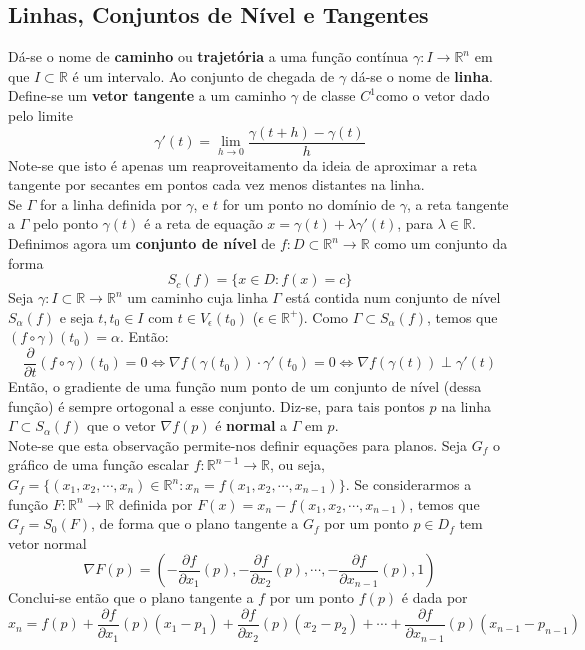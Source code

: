 \documentclass{article}
\newcommand{\R}{\mathbb{R}}
\begin{document}
\subsection{Linhas, Conjuntos de Nível e Tangentes}
Dá-se o nome de \textbf{caminho} ou \textbf{trajetória} a uma função contínua $\gamma: I \to \R^n$ em que $I \subset \R$ é um intervalo. Ao conjunto de chegada de $\gamma$ dá-se o nome de \textbf{linha}.\\
Define-se um \textbf{vetor tangente} a um caminho $\gamma$ de classe $C^1$como o vetor dado pelo limite
$$
\gamma '(t) = \lim_{h \to 0} \frac{\gamma(t+h)-\gamma(t)}{h}
$$
Note-se que isto é apenas um reaproveitamento da ideia de aproximar a reta tangente por secantes em pontos cada vez menos distantes na linha.\\
Se $\Gamma$ for a linha definida por $\gamma$, e $t$ for um ponto no domínio de $\gamma$, a reta tangente a $\Gamma$ pelo ponto $\gamma (t)$ é a reta de equação $x = \gamma(t) + \lambda \gamma '(t)$, para $\lambda \in \R$. \\
Definimos agora um \textbf{conjunto de nível} de $f: D \subset \R^n \to \R$ como um conjunto da forma 
$$
S_c(f) = \{ x \in D: f(x)=c \}
$$
Seja $\gamma: I \subset \R \to \R^n$ um caminho cuja linha $\Gamma$ está contida num conjunto de nível $S_\alpha (f)$ e seja $t, t_0 \in I$ com $t \in V_\epsilon(t_0)$ ($\epsilon \in \R^+$). Como $\Gamma \subset S_\alpha(f)$, temos que $(f \circ \gamma) (t_0) = \alpha$. Então:
$$
\frac{\partial}{\partial t} (f \circ \gamma)(t_0) = 0 \Leftrightarrow \nabla f(\gamma(t_0)) \cdot \gamma'(t_0) = 0 \Leftrightarrow \nabla f(\gamma (t)) \perp \gamma'(t)
$$
Então, o gradiente de uma função num ponto de um conjunto de nível (dessa função) é sempre ortogonal a esse conjunto. Diz-se, para tais pontos $p$ na linha $\Gamma \subset S_\alpha (f)$ que o vetor $\nabla f(p)$ é \textbf{normal} a $\Gamma$ em $p$.\\ 
Note-se que esta observação permite-nos definir equações para planos. Seja $G_f$ o gráfico de uma função escalar $f: \R^{n-1} \to \R$, ou seja, $G_f = \{ (x_1, x_2, \cdots, x_n) \in \R^n : x_n = f(x_1, x_2, \cdots , x_{n-1}) \}$. Se considerarmos a função $F: \R^n \to \R$ definida por $F(x) = x_n - f(x_1, x_2, \cdots , x_{n-1})$, temos que $G_f = S_0(F)$, de forma que o plano tangente a $G_f$ por um ponto $p \in D_f$ tem vetor normal 
$$
\nabla F(p) = \left( -\frac{\partial f}{\partial x_1}(p), -\frac{\partial f}{\partial x_2}(p), \cdots , -\frac{\partial f}{\partial x_{n-1}}(p), 1 \right)  
$$
Conclui-se então que o plano tangente a $f$ por um ponto $f(p)$ é dada por
$$
x_n = f(p) + \frac{\partial f}{\partial x_1}(p)(x_1-p_1) + \frac{\partial f}{\partial x_2}(p)(x_2-p_2) + \cdots + \frac{\partial f}{\partial x_{n-1}}(p)(x_{n-1}-p_{n-1}) 
$$
\end{document}
